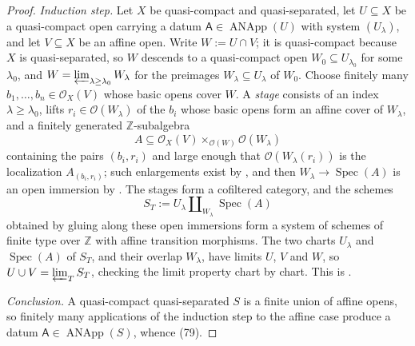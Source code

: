 \begin{proof}
  \emph{Induction step.}  Let $X$ be quasi-compact and quasi-separated, let
  $U\subseteq X$ be a quasi-compact open carrying a datum
  $\mathsf A\in\operatorname{ANApp}(U)$ with system $(U_\lambda)$, and let
  $V\subseteq X$ be an affine open.  Write $W:=U\cap V$; it is quasi-compact
  because $X$ is quasi-separated, so $W$ descends to a quasi-compact open
  $W_0\subseteq U_{\lambda_0}$ for some $\lambda_0$, and
  $W=\varprojlim_{\lambda\geq\lambda_0}W_\lambda$ for the preimages
  $W_\lambda\subseteq U_\lambda$ of $W_0$.  Choose finitely many
  $b_1,\dots,b_n\in\mathcal O_X(V)$ whose basic opens cover $W$.  A
  \emph{stage} consists of an index $\lambda\geq\lambda_0$, lifts
  $r_i\in\mathcal O(W_\lambda)$ of the $b_i$ whose basic opens form an affine
  cover of $W_\lambda$, and a finitely generated $\mathbb Z$-subalgebra
  \[
    A\subseteq
      \mathcal O_X(V)\times_{\mathcal O(W)}\mathcal O(W_\lambda)
  \]
  containing the pairs $(b_i,r_i)$ and large enough that
  $\mathcal O(W_\lambda(r_i))$ is the localization $A_{(b_i,r_i)}$; such
  enlargements exist by
  \cite[\href{https://stacks.math.columbia.edu/tag/01Z7}{Tag 01Z7}]
    {stacks-project}, and then $W_\lambda\to\operatorname{Spec}(A)$ is an open
  immersion by
  \cite[\href{https://stacks.math.columbia.edu/tag/01Z9}{Tag 01Z9}]
    {stacks-project}.  The stages form a cofiltered category, and the schemes
  \[
    S_T:=U_\lambda\amalg_{W_\lambda}\operatorname{Spec}(A)
  \]
  obtained by gluing along these open immersions form a system of schemes of
  finite type over $\mathbb Z$ with affine transition morphisms.  The two
  charts $U_\lambda$ and $\operatorname{Spec}(A)$ of $S_T$, and their overlap
  $W_\lambda$, have limits $U$, $V$ and $W$, so
  $U\cup V=\varprojlim_T S_T$, checking the limit property chart by chart.
  This is
  \cite[\href{https://stacks.math.columbia.edu/tag/07RN}{Tag 07RN}]
    {stacks-project}.

  \emph{Conclusion.}  A quasi-compact quasi-separated $S$ is a finite union of
  affine opens, so finitely many applications of the induction step to the
  affine case produce a datum $\mathsf A\in\operatorname{ANApp}(S)$, whence
  (79).
\end{proof}

